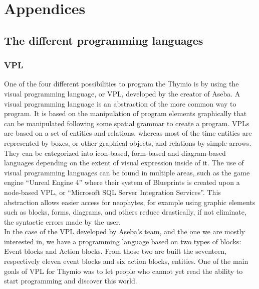 \documentclass{scrartcl}
\begin{document}
\section{Appendices}

\subsection{The different programming languages} \label{fourlanguages}
\subsubsection{VPL}

One of the four different possibilities to program the Thymio is by using the visual programming language, or VPL, 
developed by the creator of Aseba. A visual programming language is an abstraction of the more common way to program. 
It is based on the manipulation of program elements graphically that can be manipulated following some spatial grammar to create a program. 
VPLs are based on a set of entities and relations, whereas most of the time entities are represented by boxes, 
or other graphical objects, and relations by simple arrows. They can be categorized into icon-based, 
form-based and diagram-based languages depending on the extent of visual expression inside of it. 
The use of visual programming languages can be found in multiple areas, such as the game engine “Unreal Engine 4” where their system of Blueprints is created upon a node-based VPL, 
or “Microsoft SQL Server Integration Services”. This abstraction allows easier access for neophytes, 
for example using graphic elements such as blocks, forms, diagrams, and others reduce drastically, if not eliminate, the syntactic errors made by the user.\\

In the case of the VPL developed by Aseba’s team, and the one we are mostly interested in, we have a programming language based on two types of blocks: Event blocks and Action blocks. 
From those two are built the seventeen, respectively eleven event blocks and six action blocks, entities. 
One of the main goals of VPL for Thymio was to let people who cannot yet read the ability to start programming and discover this world.\\
\end{document}
